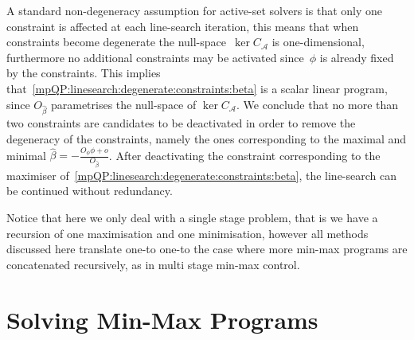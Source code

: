\documentclass[journal]{IEEEtran}
\theoremstyle{remark}
\theoremstyle{definition}
\begin{document}
A standard non-degeneracy assumption for active-set solvers is that only one constraint is affected at each line-search
iteration, this means that when constraints become degenerate the null-space~$\ker C_{\mathcal A}$ is
one-dimensional, furthermore no additional constraints may be activated since~$\phi$ is already fixed by
the constraints.
%
This implies that~\eqref{mpQP:linesearch:degenerate:constraints:beta} is a scalar linear program, since
$O_{\hat\beta}$ parametrises the null-space of $\ker C_{\mathcal A}$.
%
We conclude that no more than two constraints are candidates to be deactivated in order to remove the degeneracy
of the constraints, namely the ones corresponding to the maximal and minimal $\hat\beta=
-\frac{O_\phi\phi+o}{O_{\hat\beta}}$.
%
After deactivating the constraint corresponding to the maximiser of~\eqref{mpQP:linesearch:degenerate:constraints:beta},
the line-search can be continued without redundancy.


Notice that here we only deal with a single stage problem, that is we have a recursion of one
maximisation and one minimisation, however all methods discussed here translate one-to one-to the
case where more min-max programs are concatenated recursively, as in multi stage min-max control.
%
%
%
%
\section{Solving Min-Max Programs}\label{sec:solving:min:max:programs}
\end{document}
